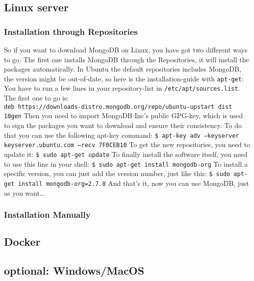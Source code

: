\subsection{Linux server}

\subsubsection{Installation through Repositories}
So if you want to download MongoDB on Linux, you have got two different ways to go:
The first one installs MongoDB through the Repositories, it will install the packages automatically. 
In Ubuntu the default repositories includes MongoDB, the version might be out-of-date, so here is the installation-guide with \texttt{apt-get}:
You have to run a few lines in your repository-list in \texttt{/etc/apt/sources.list}.
\\
The first one to go is: \\
\texttt{deb https://downloads-distro.mongodb.org/repo/ubuntu-upstart dist 10gen}        %
Then you need to import MongoDB Inc's public GPG-key, which is used to sign the packages you want to download and ensure their consistency. 
To do that you can use the following apt-key command: 
\texttt{\$ apt-key adv --keyserver keyserver.ubuntu.com --recv 7F0CEB10}
To get the new repositories, you need to update it:
\texttt{\$ sudo apt-get update}
To finally install the software itself, you need to use this line in your shell:
\texttt{\$ sudo apt-get install mongodb-org}
To install a specific version, you can just add the version number, just like this:
\texttt{\$ sudo apt-get install mongodb-org=2.7.8}
And that's it, now you can use MongoDB, just as you want\dots

\subsubsection{Installation Manually}



\subsection{Docker}

\subsection{optional: Windows/MacOS}


\parencite{Mongo-Installation}

\parencite[p. ]{Subramanian2019}